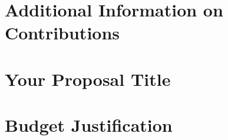 \documentclass[12pt,english]{nserc-appendix}
\newcommand{\ccvcitation}[1]{[#1]}
\begin{document}
\section{Additional Information on Contributions}

\clearpage

\setcounter{page}{1}
\section{Your Proposal Title}

\clearpage

\setcounter{page}{1}
\section{Budget Justification}

%
\clearpage
% 
%
%
% 
\pagestyle{plain}
\setcounter{page}{1}
% 
\setlength{}

\end{document}
